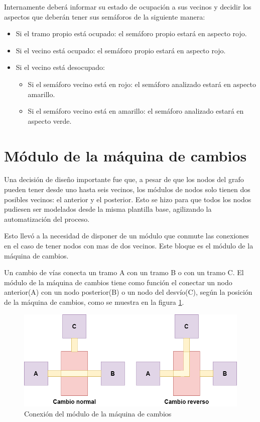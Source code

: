 	
	Internamente deberá informar su estado de ocupación a sus vecinos y decidir los aspectos que deberán tener sus semáforos de la siguiente manera:
			
	\begin{itemize}
		\item Si el tramo propio está ocupado: el semáforo propio estará en aspecto rojo.
		\item Si el vecino está ocupado: el semáforo propio estará en aspecto rojo.
		\item Si el vecino está desocupado:
		\begin{itemize}
			\item Si el semáforo vecino está en rojo: el semáforo analizado estará en aspecto amarillo.
			\item Si el semáforo vecino está en amarillo:  el semáforo analizado estará en aspecto verde.
		\end{itemize}				 
	\end{itemize}
	
\section{Módulo de la máquina de cambios}

	Una decisión de diseño importante fue que, a pesar de que los nodos del grafo pueden tener desde uno hasta seis vecinos, los módulos de nodos solo tienen dos posibles vecinos: el anterior y el posterior. Esto se hizo para que todos los nodos pudiesen ser modelados desde la misma plantilla base, agilizando la automatización del proceso.
	
	Esto llevó a la necesidad de disponer de un módulo que conmute las conexiones en el caso de tener nodos con mas de dos vecinos. Este bloque es el módulo de la máquina de cambios.
	
	Un cambio de vías conecta un tramo A con un tramo B o con un tramo C. El módulo de la máquina de cambios tiene como función el conectar un nodo anterior(A) con un nodo posterior(B) o un nodo del desvío(C), según la posición de la máquina de cambios, como se muestra en la figura \ref{fig:Cambio_conexion}.
	
	\begin{figure}[h]
	\centering
	\includegraphics[scale=.5]{./Figures/FSMD-Conexiones}
		\caption{Conexión del módulo de la máquina de cambios}
		\label{fig:Cambio_conexion}
	\end{figure}	
	
